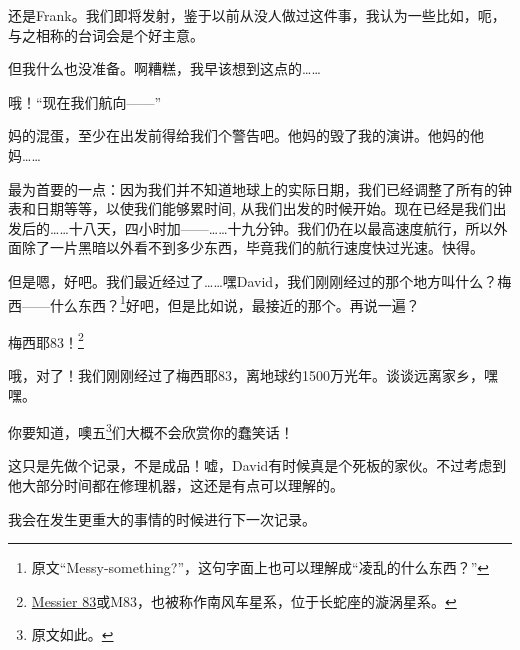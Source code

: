 \hr

\begin{scpbox}


还是Frank。我们即将发射，鉴于以前从没人做过这件事，我认为一些比如，呃，与之相称的台词会是个好主意。


但我什么也没准备。啊糟糕，我早该想到这点的……


哦！“现在我们航向——”


妈的混蛋，至少在出发前得给我们个警告吧。他妈的毁了我的演讲。他妈的他妈……


\end{scpbox}

\hr

\begin{scpbox}


最为首要的一点：因为我们并不知道地球上的实际日期，我们已经调整了所有的钟表和日期等等，以使我们能够累时间, 从我们出发的时候开始。现在已经是我们出发后的……十八天，四小时加——……十九分钟。我们仍在以最高速度航行，所以外面除了一片黑暗以外看不到多少东西，毕竟我们的航行速度快过光速。快得。

但是嗯，好吧。我们最近经过了……嘿David，我们刚刚经过的那个地方叫什么？梅西——什么东西？\footnote{原文“Messy-something?”，这句字面上也可以理解成“凌乱的什么东西？”}好吧，但是比如说，最接近的那个。再说一遍？

梅西耶83！\footnote{\hyperref[chap:]{Messier 83}或M83，也被称作南风车星系，位于长蛇座的漩涡星系。}

哦，对了！我们刚刚经过了梅西耶83，离地球约1500万光年。谈谈远离家乡，嘿嘿。

你要知道，噢五\footnote{原文如此。}们大概不会欣赏你的蠢笑话！

这只是先做个记录，不是成品！嘘，David有时候真是个死板的家伙。不过考虑到他大部分时间都在修理机器，这还是有点可以理解的。

我会在发生更重大的事情的时候进行下一次记录。


\end{scpbox}

